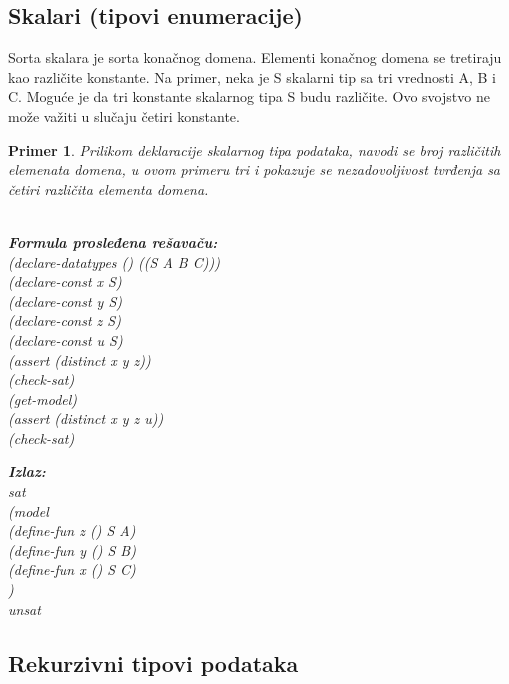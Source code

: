 \documentclass[12pt,oneside]{memoir}
\newcommand\tab[1][0.5cm]{\hspace*{#1}}
\newtheorem{primer}{Primer}
\begin{document}
\subsection{Skalari (tipovi enumeracije)}

Sorta skalara je sorta konačnog domena. Elementi konačnog domena se tretiraju kao različite konstante. Na primer, neka je S skalarni tip sa tri vrednosti A, B i C. Moguće je da tri konstante skalarnog tipa S budu različite. Ovo svojstvo ne može važiti u slučaju četiri konstante.

\begin{primer} Prilikom deklaracije skalarnog tipa podataka, navodi se broj različitih elemenata domena, u ovom primeru tri i pokazuje se nezadovoljivost tvrđenja sa četiri različita elementa domena. \\ \\
\begin{minipage}[b]{0.5\textwidth}
\textbf{Formula prosleđena rešavaču:}
\\(declare-datatypes () ((S A B C)))
\\(declare-const x S)
\\(declare-const y S)
\\(declare-const z S)
\\(declare-const u S)
\\(assert (distinct x y z))
\\(check-sat)
\\(get-model)
\\(assert (distinct x y z u))
\\(check-sat)
\end{minipage}
\hspace{2.5cm} 
\begin{minipage}[t]{0.5\textwidth}
\vspace{-6.58cm}
\textbf{Izlaz:}
\\sat 
\\(model 
\\\tab(define-fun z () S A) 
\\\tab(define-fun y () S B) 
\\\tab(define-fun x () S C)  
\\)
\\unsat
\end{minipage}
\end{primer}

\subsection{Rekurzivni tipovi podataka}
\end{document}
